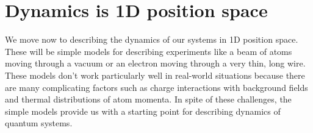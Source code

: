 
\chapter{Dynamics is 1D position space}
We move now to describing the dynamics of our systems in 1D position space. These will be simple models for describing experiments like a beam of atoms moving through a vacuum or an electron moving through a very thin, long wire. These models don't work particularly well in real-world situations because there are many complicating factors such as charge interactions with background fields and thermal distributions of atom momenta. In spite of these challenges, the simple models provide us with a starting point for describing dynamics of quantum systems.

